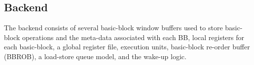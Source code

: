 \subsection{Backend}
\label{sec:cpu_backend}

The backend consists of several basic-block window buffers used to store
basic-block operations and the meta-data associated with each BB, local registers
for each basic-block, a global register file, execution units, basic-block re-order
buffer (BBROB), a load-store queue model, and the wake-up logic.








